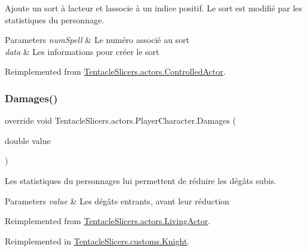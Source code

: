 Ajoute un sort à l\textquotesingle{}acteur et l\textquotesingle{}associe à un indice positif. Le sort est modifié par les statistiques du personnage. 


\begin{DoxyParams}{Parameters}
{\em num\+Spell} & Le numéro associé au sort \\
\hline
{\em data} & Les informations pour créer le sort \\
\hline
\end{DoxyParams}


Reimplemented from \hyperlink{class_tentacle_slicers_1_1actors_1_1_controlled_actor_afcfec115f484efa6142c2f82e1a1f4d5}{Tentacle\+Slicers.\+actors.\+Controlled\+Actor}.

\mbox{\label{class_tentacle_slicers_1_1actors_1_1_player_character_a40d9846096c2aaddb7112631310b240b}} 
\subsubsection{\texorpdfstring{Damages()}{Damages()}}
{\footnotesize\ttfamily override void Tentacle\+Slicers.\+actors.\+Player\+Character.\+Damages (\begin{DoxyParamCaption}\item[{double}]{value }\end{DoxyParamCaption})\hspace{0.3cm}{\ttfamily [virtual]}}



Les statistiques du personnages lui permettent de réduire les dégâts subis. 


\begin{DoxyParams}{Parameters}
{\em value} & Les dégâts entrants, avant leur réduction \\
\hline
\end{DoxyParams}


Reimplemented from \hyperlink{class_tentacle_slicers_1_1actors_1_1_living_actor_a14c215128afe9c82bb57237501f41640}{Tentacle\+Slicers.\+actors.\+Living\+Actor}.



Reimplemented in \hyperlink{class_tentacle_slicers_1_1customs_1_1_knight_aa910b96f987e5aba0fb93b2aeabe6261}{Tentacle\+Slicers.\+customs.\+Knight}.

